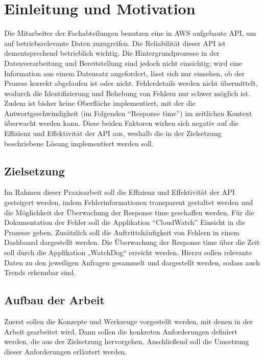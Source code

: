 \section{Einleitung und Motivation}
Die Mitarbeiter der Fachabteilungen benutzen eine in AWS aufgebaute API, um auf betriebsrelevante Daten zuzugreifen. Die Reliabilität dieser API ist dementsprechend betrieblich wichtig. Die Hintergrundprozesse in der Datenverarbeitung und Bereitstellung sind jedoch nicht einsichtig; wird eine Information aus einem Datensatz angefordert, lässt sich nur einsehen, ob der Prozess korrekt abgelaufen ist oder nicht. Fehlerdetails werden nicht übermittelt, wodurch die Identifizierung und Behebung von Fehlern nur schwer möglich ist. Zudem ist bisher keine Oberfläche implementiert, mit der die Antwortgeschwindigkeit (im Folgenden ``Response time'') im zeitlichen Kontext überwacht werden kann. Diese beiden Faktoren wirken sich negativ auf die Effizienz und Effektivität der API aus, weshalb die in der Zielsetzung beschriebene Lösung implementiert werden soll.
\subsection{Zielsetzung}
Im Rahmen dieser Praxisarbeit soll die Effizienz  und Effektivität der API gesteigert werden, indem Fehlerinformationen transparent gestaltet werden und die Möglichkeit der Überwachung der Response time geschaffen werden. Für die Dokumentation der Fehler soll die Applikation ``CloudWatch'' Einsicht in die Prozesse geben. Zusätzlich soll die Auftrittshäufigkeit von Fehlern in einem Dashboard dargestellt werden. Die Überwachung der Response time über die Zeit soll durch die Applikation „WatchDog“ erreicht werden. Hierzu sollen relevante Daten zu den jeweiligen Anfragen gesammelt und dargestellt werden, sodass auch Trends erkennbar sind. 
\subsection{Aufbau der Arbeit}
Zuerst sollen die Konzepte und Werkzeuge vorgestellt werden, mit denen in der Arbeit gearbeitet wird. Dann sollen die konkreten Anforderungen definiert werden, die aus der Zielsetzung hervorgehen. Anschließend soll die Umsetzung dieser Anforderungen erläutert werden.  
